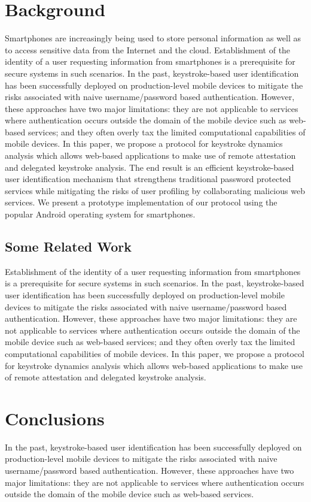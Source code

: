 \documentclass{article}
\begin{document}
\section{Background} 
Smartphones are increasingly being used to store personal information as well as to access sensitive data from the Internet and the cloud. Establishment of the identity of a user requesting information from smartphones is a prerequisite for  secure systems in such scenarios. In the past, keystroke-based user identification has been successfully deployed on production-level mobile devices to mitigate the risks associated with naive username/password based authentication. However, these approaches have two major limitations: they are not applicable to services where authentication occurs outside the domain of the mobile
device such as web-based services; and they often overly tax the limited computational capabilities of mobile devices. In this paper, we propose a protocol for keystroke dynamics analysis which allows web-based applications to make use of remote attestation and delegated keystroke analysis. The end result is an efficient keystroke-based user identification mechanism that strengthens traditional password protected services
while mitigating the risks of user profiling by collaborating malicious web
services. We present a prototype implementation of our protocol using
the popular Android operating system for smartphones.

\subsection{Some Related Work} 
Establishment of the identity of a user requesting information from smartphones is a prerequisite for  secure systems in such scenarios. In the past, keystroke-based user identification has been successfully deployed on production-level mobile devices to mitigate the risks associated with naive username/password based authentication. However, these approaches have two major limitations: they are not applicable to services where authentication occurs outside the domain of the mobile
device such as web-based services; and they often overly tax the limited computational capabilities of mobile devices. In this paper, we propose a protocol for keystroke dynamics analysis which allows web-based applications to make use of remote attestation and delegated keystroke analysis.

\section{Conclusions}
In the past, keystroke-based user identification has been successfully deployed on production-level mobile devices to mitigate the risks associated with naive username/password based authentication. However, these approaches have two major limitations: they are not applicable to services where authentication occurs outside the domain of the mobile
device such as web-based services.
\end{document}
